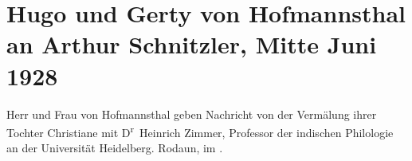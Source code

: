 

         
         \renewcommand{\erwaehntePersonen}{Personen: Christiane von Hofmannsthal, Heinrich Zimmer}
         \renewcommand{\erwaehnteInstitutionen}{Institutionen: Ruprecht-Karls-Universität Heidelberg}
         \renewcommand{\erwaehnteOrte}{Orte: Rodaun, Wien}
         \renewcommand{\erwaehnteWerke}{}
               \section[Hugo und Gerty von Hofmannsthal an Arthur Schnitzler, Mitte Juni 1928]{ Hugo und Gerty von Hofmannsthal an Arthur Schnitzler, Mitte Juni
               1928}\nopagebreak{}\rehead{ }\begin{ledgroupsized}[t]{13cm}\normalsize\beginnumbering \toendnotes[C]{\smallbreak\pagebreak[2]} 
\toendnotes[C]{\smallbreak}\pstart
           \noindent{}{\pb}Herr und Frau von Hofmannsthal geben Nachricht von der
               Vermälung ihrer Tochter Christiane
               mit D\textsuperscript{r} Heinrich
                  Zimmer, Professor der indischen Philologie an der Universität Heidelberg.\pend
           \pstart
           Rodaun, im \label{K_L02502_1v}\label{K_L02502_1h}.\pend
           
         
         \endnumbering{}\end{ledgroupsized}  \newcommand{\dateiname}{L02502}\newcommand{\titel}{Hugo und Gerty von Hofmannsthal an Arthur Schnitzler, Mitte Juni 1928}\newcommand{\editorInnen}{Martin Anton Müller und Gerd-Hermann Susen}
      
